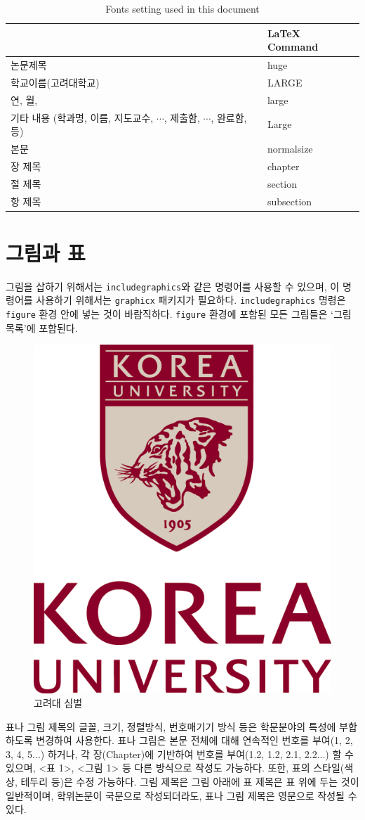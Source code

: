 \documentclass[11pt]{report}
\numberwithin{figure}{chapter}
\begin{document}
\begin{table}\centering
\caption{Fonts setting used in this document}
\vspace{0.5cm}
\begin{tabular}{  m{7cm}  m{5cm} }
\hline 				&     \LaTeX{} Command \\\hline 
논문제목				& huge \\
학교이름(고려대학교)	& LARGE \\
연, 월, 				& large\\
기타 내용 (학과명, 이름, 지도교수, \(\cdots\), 제출함, \(\cdots\), 완료함,등)	& Large\\
본문					& normalsize	\\
장 제목   			& chapter \\
절 제목				& section \\
항 제목				& subsection \\\hline

\end{tabular}
\end{table}



\newpage
\section{그림과 표}\label{sec:figures_and_table}

그림을 삽하기 위해서는 \texttt{includegraphics}와 같은 명령어를 사용할 수 있으며, 이 명령어를 사용하기 위해서는 \texttt{graphicx} 패키지가 필요하다.
\texttt{includegraphics} 명령은 \texttt{figure} 환경 안에 넣는 것이 바람직하다.
\texttt{figure} 환경에 포함된 모든 그림들은 `그림 목록'에 포함된다.

\renewcommand\figurename{그림}
\begin{figure}
\begin{center}
\vspace{0.5cm}
\includegraphics[width=.2\textwidth]{kumark.png}
\end{center}
\caption{고려대 심벌}
\end{figure}

표나 그림 제목의 글꼴, 크기, 정렬방식, 번호매기기 방식 등은 학문분야의 특성에 부합하도록 변경하여 사용한다. 표나 그림은 본문 전체에 대해 연속적인 번호를 부여(1, 2, 3, 4, 5...) 하거나, 각 장(Chapter)에 기반하여 번호를 부여(1.2, 1.2, 2.1, 2.2...) 할 수 있으며, <표 1>, <그림 1> 등 다른 방식으로 작성도 가능하다. 또한, 표의 스타일(색상, 테두리 등)은 수정 가능하다. 그림 제목은 그림 아래에 표 제목은 표 위에 두는 것이 일반적이며, 학위논문이 국문으로 작성되더라도, 표나 그림 제목은 영문으로 작성될 수 있다. \par
\end{document}
